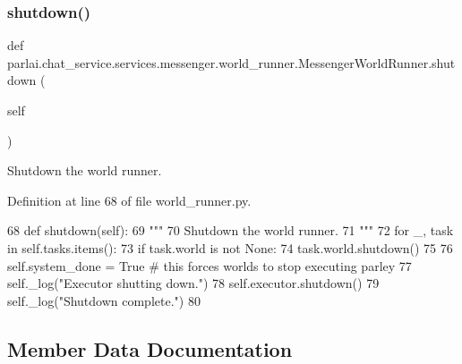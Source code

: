 \subsubsection{\texorpdfstring{shutdown()}{shutdown()}}
{\footnotesize\ttfamily def parlai.\+chat\+\_\+service.\+services.\+messenger.\+world\+\_\+runner.\+Messenger\+World\+Runner.\+shutdown (\begin{DoxyParamCaption}\item[{}]{self }\end{DoxyParamCaption})}

\begin{DoxyVerb}Shutdown the world runner.
\end{DoxyVerb}
 

Definition at line 68 of file world\+\_\+runner.\+py.


\begin{DoxyCode}
68     \textcolor{keyword}{def }shutdown(self):
69         \textcolor{stringliteral}{"""}
70 \textcolor{stringliteral}{        Shutdown the world runner.}
71 \textcolor{stringliteral}{        """}
72         \textcolor{keywordflow}{for} \_, task \textcolor{keywordflow}{in} self.tasks.items():
73             \textcolor{keywordflow}{if} task.world \textcolor{keywordflow}{is} \textcolor{keywordflow}{not} \textcolor{keywordtype}{None}:
74                 task.world.shutdown()
75 
76         self.system\_done = \textcolor{keyword}{True}  \textcolor{comment}{# this forces worlds to stop executing parley}
77         self.\_log(\textcolor{stringliteral}{"Executor shutting down."})
78         self.executor.shutdown()
79         self.\_log(\textcolor{stringliteral}{"Shutdown complete."})
80 
\end{DoxyCode}


\subsection{Member Data Documentation}
\mbox{\label{classparlai_1_1chat__service_1_1services_1_1messenger_1_1world__runner_1_1MessengerWorldRunner_a2f850eb160165940f64fdec3f0a8af8f}} 
